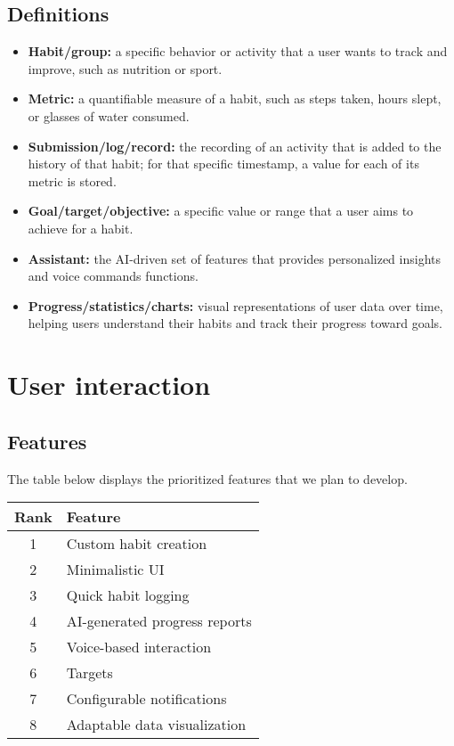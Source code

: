 \documentclass{article}
\begin{document}
\subsection{Definitions}

\begin{itemize}
	\item \textbf{Habit/group:} a specific behavior or activity that a user wants to track and improve, such as nutrition or sport.
	\item \textbf{Metric:} a quantifiable measure of a habit, such as steps taken, hours slept, or glasses of water consumed.
	\item \textbf{Submission/log/record:} the recording of an activity that is added to the history of that habit; for that specific timestamp, a value for each of its metric is stored.
	\item \textbf{Goal/target/objective:} a specific value or range that a user aims to achieve for a habit.
	\item \textbf{Assistant:} the AI-driven set of features that provides personalized insights and voice commands functions.
	\item \textbf{Progress/statistics/charts:} visual representations of user data over time, helping users understand their habits and track their progress toward goals.
\end{itemize}

\newpage
\section{User interaction}

\subsection{Features}

The table below displays the prioritized features that we plan to develop.

\begin{table}[H]
	\centering
	\begin{tabularx}{0.5\textwidth}{c|X}
		\hline
		\textbf{Rank} & \textbf{Feature}              \\
		\hline
		1             & Custom habit creation         \\
		2             & Minimalistic UI               \\
		3             & Quick habit logging           \\
		4             & AI-generated progress reports \\
		5             & Voice-based interaction       \\
		6             & Targets                       \\
		7             & Configurable notifications    \\
		8             & Adaptable data visualization  \\
		\hline
	\end{tabularx}
\end{table}
\end{document}
